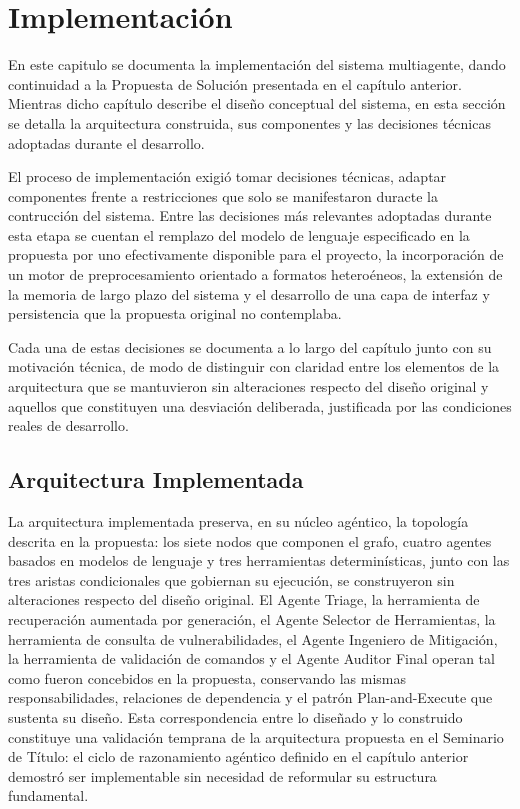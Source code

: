 \chapter{Implementación}

En este capitulo se documenta la implementación del sistema multiagente,  dando continuidad a la Propuesta de
Solución presentada en el capítulo anterior. Mientras dicho capítulo describe el diseño conceptual del sistema, en esta sección se detalla la arquitectura construida, sus componentes y las decisiones técnicas adoptadas
durante el desarrollo.

El proceso de implementación exigió tomar decisiones técnicas, adaptar componentes frente a restricciones que solo se manifestaron duracte la contrucción del sistema. Entre las decisiones más relevantes adoptadas durante esta etapa se cuentan el remplazo del modelo de lenguaje especificado en la propuesta por uno efectivamente disponible para el proyecto, la incorporación de un motor de preprocesamiento orientado a formatos heteroéneos, la extensión de la memoria de largo plazo del sistema y el desarrollo de una capa de interfaz y persistencia que la propuesta original no contemplaba.

Cada una de estas decisiones se documenta a lo largo del capítulo junto con su motivación técnica, de modo de distinguir con claridad entre los elementos de la arquitectura que se mantuvieron sin alteraciones respecto del diseño original y aquellos que constituyen una desviación deliberada, justificada por las condiciones reales de desarrollo.


\section{Arquitectura Implementada}

La arquitectura implementada preserva, en su núcleo agéntico, la topología
descrita en la propuesta: los siete nodos que componen el grafo, cuatro
agentes basados en modelos de lenguaje y tres herramientas determinísticas, junto con las tres aristas condicionales que gobiernan su
ejecución, se construyeron sin alteraciones respecto del diseño original.
El Agente Triage, la herramienta de recuperación aumentada por generación,
el Agente Selector de Herramientas, la herramienta de consulta de
vulnerabilidades, el Agente Ingeniero de Mitigación, la herramienta de
validación de comandos y el Agente Auditor Final operan tal como fueron
concebidos en la propuesta, conservando las mismas responsabilidades,
relaciones de dependencia y el patrón Plan-and-Execute que sustenta su
diseño. Esta correspondencia entre lo diseñado y lo construido constituye
una validación temprana de la arquitectura propuesta en el Seminario de
Título: el ciclo de razonamiento agéntico definido en el capítulo anterior
demostró ser implementable sin necesidad de reformular su estructura
fundamental.

